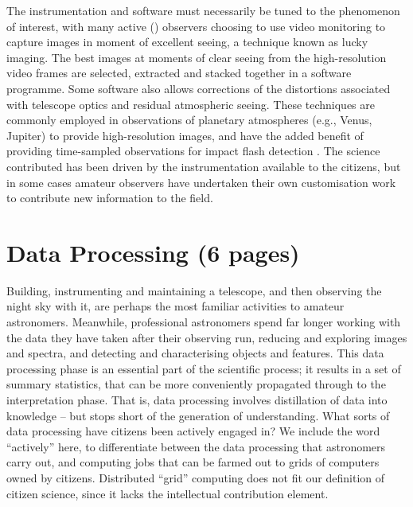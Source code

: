 \documentclass{ar2e}
\begin{document}
The instrumentation and software must necessarily be tuned to the phenomenon of
interest, with many active () observers choosing
to use video monitoring to capture images in moment of excellent seeing, a
technique known as lucky imaging.  The best images at moments of clear seeing
from the high-resolution video frames are selected, extracted and stacked
together in a software programme.  Some software also allows corrections of the
distortions associated with telescope optics and residual atmospheric seeing. 
These techniques are commonly employed in observations of planetary atmospheres
(e.g., Venus, Jupiter) to provide high-resolution images, and have the added
benefit of providing time-sampled observations for impact flash detection
\citep[e.g.,][]{10hueso}. The science contributed has been driven by the
instrumentation available to the citizens, but in some cases amateur observers
have undertaken their own customisation work to contribute new information to
the field.  





\section{Data Processing (6 pages)}
\label{sec:class}

Building, instrumenting and maintaining a telescope, and then observing the
night sky with it, are perhaps the most familiar activities to amateur
astronomers. Meanwhile, professional astronomers spend far longer working with
the data they have taken after their observing run, reducing and exploring
images and spectra, and detecting and characterising objects and features. This
data processing phase is an essential part of the scientific process; it results
in a set of summary statistics, that can be more
conveniently propagated through to the interpretation phase. That is, data
processing involves distillation of data into knowledge -- but stops short of
the generation of understanding. What sorts of data processing have citizens
been actively engaged in? We include the word ``actively'' here, to
differentiate between the data processing that astronomers carry out, and 
computing jobs that can be farmed out to grids of computers owned by citizens.
Distributed ``grid'' computing does not fit our definition of citizen science, 
since it lacks the intellectual contribution element.
\end{document}
